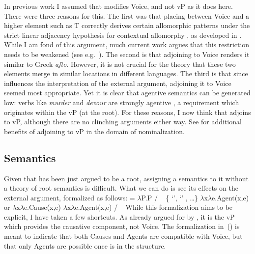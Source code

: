 {In previous work \citep{kastner16phd,kastner17gjgl,kastner18nllt} I assumed that {\va} modifies Voice, and not vP as it does here. There were three reasons for this. The first was that placing {\va} between Voice and a higher element such as T correctly derives certain allomorphic patterns under the strict linear adjacency hypothesis for contextual allomorphy \citep{embick10,marantz13}, as developed in \cite{kastner18nllt}. While I am fond of this argument, much current work argues that this restriction needs to be weakened (see e.g.~\citealt{kastnermoskal18,choiharley19}). The second is that adjoining {\va} to Voice renders it similar to Greek \emph{afto}. However, it is not crucial for the theory that these two elements merge in similar locations in different languages. The third is that since {\va} influences the interpretation of the external argument, adjoining it to Voice seemed most appropriate. Yet it is clear that agentive semantics can be generated low: verbs like \emph{murder} and \emph{devour} are strongly agentive \citep{haspelmath93,unaccusativity95,marantz97,layering15}, a requirement which originates within the vP (at the root). For these reasons, I now think that {\va} adjoins to vP, although there are no clinching arguments either way. See \cite{ahdout19phd} for additional benefits of adjoining {\va} to vP in the domain of nominalization.

	\subsection{Semantics} \label{voice:va:sem}
Given that {\va} has been just argued to be a root, assigning a semantics to it without a theory of root semantics is difficult. What we can do is see its effects on the external argument, formalized as follows:
\pex {} = 
	\a $\lambda$P.P \phantom{agent(x,e)xxx} / \trace~ \{  `',  `' , \dots \}
	\a $\lambda$x$\lambda$e.Agent(x,e) or $\lambda$x$\lambda$e.Cause(x,e)
	\a $\lambda$x$\lambda$e.Agent(x,e) / \trace~\va
\xe
While this formalization aims to be explicit, I have taken a few shortcuts. As already argued for by \cite{layering15}, it is the vP which provides the causative component, not Voice. The formalization in~(\lastx) is meant to indicate that both Causes and Agents are compatible with Voice, but that only Agents are possible once {\va} is in the structure. 

}
